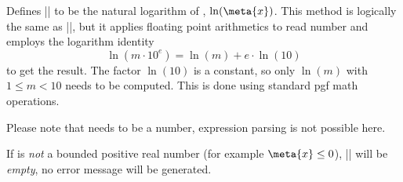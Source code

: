 \begin{command}{}
	Defines |\pgfmathresult| to be the natural logarithm of , $\ln(\meta{x})$. This method is logically the same as |\pgfmathln|, but it applies floating point arithmetics to read number  and employs the logarithm identity 
		\[ \ln(m \cdot 10^e) = \ln(m) + e \cdot \ln(10) \]
	to get the result. The factor $\ln(10)$ is a constant, so only $\ln(m)$ with $1 \le m < 10$ needs to be computed. This is done using standard pgf math operations.

	Please note that  needs to be a number, expression parsing is not possible here.

	If  is \emph{not} a bounded positive real number (for example $\meta{x} \le 0$), |\pgfmathresult| will be \emph{empty}, no error message will be generated.
\begin{codeexample}[]
\pgfmathresult
\end{codeexample}
\begin{codeexample}[]
\pgfmathresult
\end{codeexample}
\end{command}

